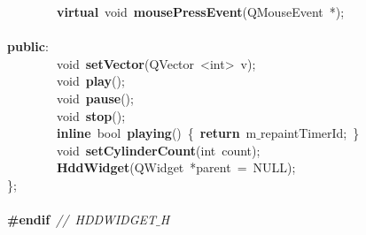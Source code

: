 \mbox{}\ \ \ \ \ \ \ \ \textbf{virtual}\ void\ \textbf{mousePressEvent}(QMouseEvent\ *); \\
\mbox{} \\
\mbox{}\textbf{public}: \\
\mbox{}\ \ \ \ \ \ \ \ void\ \textbf{setVector}(QVector\ \textless{}int\textgreater{}\ v); \\
\mbox{}\ \ \ \ \ \ \ \ void\ \textbf{play}(); \\
\mbox{}\ \ \ \ \ \ \ \ void\ \textbf{pause}(); \\
\mbox{}\ \ \ \ \ \ \ \ void\ \textbf{stop}(); \\
\mbox{}\ \ \ \ \ \ \ \ \textbf{inline}\ bool\ \textbf{playing}()\ \{\ \textbf{return}\ m$\_$repaintTimerId;\ \} \\
\mbox{}\ \ \ \ \ \ \ \ void\ \textbf{setCylinderCount}(int\ count); \\
\mbox{}\ \ \ \ \ \ \ \ \textbf{HddWidget}(QWidget\ *parent\ =\ NULL); \\
\mbox{}\}; \\
\mbox{} \\
\mbox{}\textbf{\#endif}\ \textit{//\ HDDWIDGET$\_$H} \\
\mbox{}
